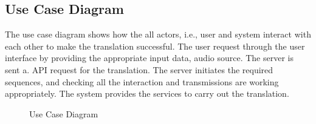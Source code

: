 \subsection{Use Case Diagram}
{\normalsize{The use case diagram shows how the all actors, i.e., user and system interact with each other to make the translation successful.
\newline
The user request through the user interface by providing the appropriate input data, audio source. The server is sent a. API request for the translation. The server initiates the required sequences, and checking all the interaction and transmissions are working appropriately. The system provides the services to carry out the translation.
}}
\newline
\newline
\begin{figure}[h]
  \begin{center}
  \caption{Use Case Diagram}
  \end{center}
\end{figure}

\clearpage
